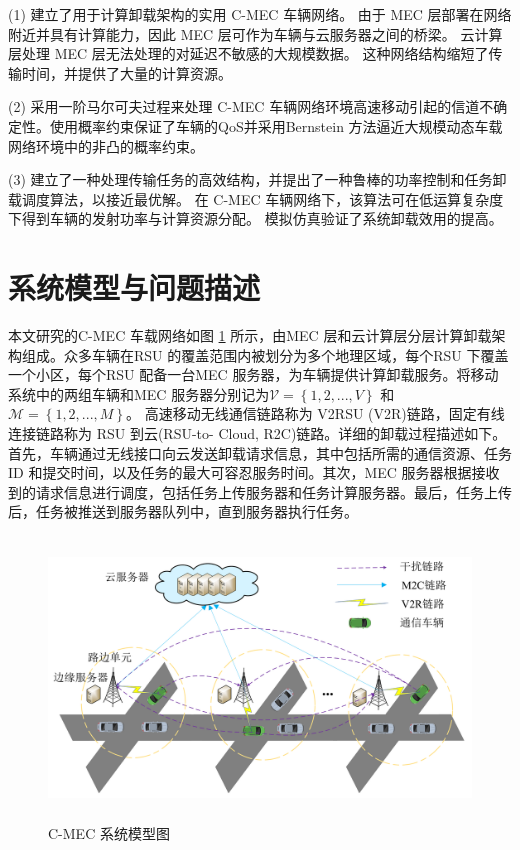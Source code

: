 (1) 建立了用于计算卸载架构的实用 C-MEC 车辆网络。 由于 MEC 层部署在网络附近并具有计算能力，因此 MEC 层可作为车辆与云服务器之间的桥梁。 云计算层处理 MEC 层无法处理的对延迟不敏感的大规模数据。 这种网络结构缩短了传输时间，并提供了大量的计算资源。

(2) 采用一阶马尔可夫过程来处理 C-MEC 车辆网络环境高速移动引起的信道不确定性。使用概率约束保证了车辆的QoS并采用Bernstein 方法逼近大规模动态车载网络环境中的非凸的概率约束。

(3) 建立了一种处理传输任务的高效结构，并提出了一种鲁棒的功率控制和任务卸载调度算法，以接近最优解。 在 C-MEC 车辆网络下，该算法可在低运算复杂度下得到车辆的发射功率与计算资源分配。 模拟仿真验证了系统卸载效用的提高。
\section{系统模型与问题描述}\label{section3-2}
本文研究的C-MEC 车载网络如图 \ref{F1} 所示，由MEC 层和云计算层分层计算卸载架构组成。众多车辆在RSU 的覆盖范围内被划分为多个地理区域，每个RSU 下覆盖一个小区，每个RSU 配备一台MEC 服务器，为车辆提供计算卸载服务。将移动系统中的两组车辆和MEC 服务器分别记为$\mathcal{V}=\left\{1,2,..., V\right\}$ 和$\mathcal{M}=\left\{1,2,..., M\right\}$。 高速移动无线通信链路称为 V2RSU (V2R)链路，固定有线连接链路称为 RSU 到云(RSU-to-
Cloud, R2C)链路。详细的卸载过程描述如下。首先，车辆通过无线接口向云发送卸载请求信息，其中包括所需的通信资源、任务 ID 和提交时间，以及任务的最大可容忍服务时间。其次，MEC 服务器根据接收到的请求信息进行调度，包括任务上传服务器和任务计算服务器。最后，任务上传后，任务被推送到服务器队列中，直到服务器执行任务。
\begin{figure}[H]
\centering
\includegraphics[width=14cm,height=7.5cm]{figures//chap3//文章一在用model2.pdf}
\caption{C-MEC 系统模型图}
\label{F1}
\end{figure}

